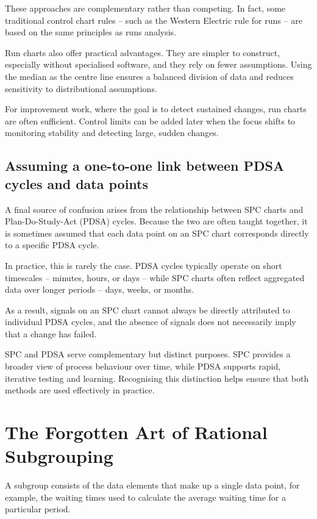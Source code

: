 \documentclass[
]{book}
\begin{document}
These approaches are complementary rather than competing. In fact, some traditional control chart rules -- such as the Western Electric rule for runs -- are based on the same principles as runs analysis.

Run charts also offer practical advantages. They are simpler to construct, especially without specialised software, and they rely on fewer assumptions. Using the median as the centre line ensures a balanced division of data and reduces sensitivity to distributional assumptions.

For improvement work, where the goal is to detect sustained changes, run charts are often sufficient. Control limits can be added later when the focus shifts to monitoring stability and detecting large, sudden changes.

\section{Assuming a one-to-one link between PDSA cycles and data points}\label{assuming-a-one-to-one-link-between-pdsa-cycles-and-data-points}

A final source of confusion arises from the relationship between SPC charts and Plan-Do-Study-Act (PDSA) cycles. Because the two are often taught together, it is sometimes assumed that each data point on an SPC chart corresponds directly to a specific PDSA cycle.

In practice, this is rarely the case. PDSA cycles typically operate on short timescales -- minutes, hours, or days -- while SPC charts often reflect aggregated data over longer periods -- days, weeks, or months.

As a result, signals on an SPC chart cannot always be directly attributed to individual PDSA cycles, and the absence of signals does not necessarily imply that a change has failed.

SPC and PDSA serve complementary but distinct purposes. SPC provides a broader view of process behaviour over time, while PDSA supports rapid, iterative testing and learning. Recognising this distinction helps ensure that both methods are used effectively in practice.

\chapter{The Forgotten Art of Rational Subgrouping}\label{subgrouping}

A subgroup consists of the data elements that make up a single data point, for example, the waiting times used to calculate the average waiting time for a particular period.
\end{document}

